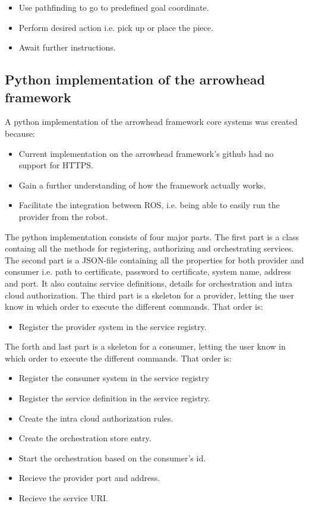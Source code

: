 \begin{itemize}
    \item Use pathfinding to go to predefined goal coordinate.
    \item Perform desired action i.e. pick up or place the piece.
    \item Await further instructions.
\end{itemize}

\subsection{Python implementation of the arrowhead framework}
A python implementation of the arrowhead framework core systems was created because:
\begin{itemize}
    \item Current implementation on the arrowhead framework's github had no support for HTTPS.
    \item Gain a further understanding of how the framework actually works.
    \item Facilitate the integration between ROS, i.e. being able to easily run the provider from the robot. 
\end{itemize}

The python implementation consists of four major parts. The first part is a class containg all the methods for registering, authorizing and
orchestrating services. The second part is a JSON-file containing all the properties for both provider and consumer i.e. path to certificate, 
password to certificate, system name, address and port. It also contains service definitions, details for orchestration and intra cloud
authorization. The third part is a skeleton for a provider, letting the user know in which order to execute the different commands. 
That order is: 
\begin{itemize}
    \item Register the provider system in the service registry.
\end{itemize}
The forth and last part is a skeleton for a consumer, letting the user know in which order to execute the different commands.
That order is:
\begin{itemize}
    \item Register the consumer system in the service registry
    \item Register the service definition in the service registry.
    \item Create the intra cloud authorization rules.
    \item Create the orchestration store entry.
    \item Start the orchestration based on the consumer's id.
    \item Recieve the provider port and address.
    \item Recieve the service URI.
\end{itemize}

